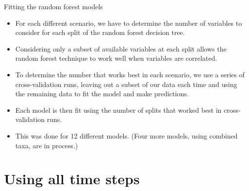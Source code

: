 \documentclass{beamer}
\begin{document}
\begin{frame}{Fitting the random forest models}

  {\footnotesize

    \begin{itemize}
  \item For each different scenario, we have to determine the number of variables to consider for each split of the random forest decision tree.
  \item Considering only a subset of available variables at each split allows the random forest technique to work well when variables are correlated.
  \item To determine the number that works best in each scenario, we use a series of cross-validation runs, leaving out a subset of our data each time and using the remaining data to fit the model and make predictions.
    \item Each model is then fit using the number of splits that
      worked best in cross-validation runs.
      \item This was done for 12 different models.  (Four more models,
        using combined taxa, are in process.)
    \end{itemize}
  }
  
\end{frame}



\section[All time steps]{Using all time steps}
\end{document}
